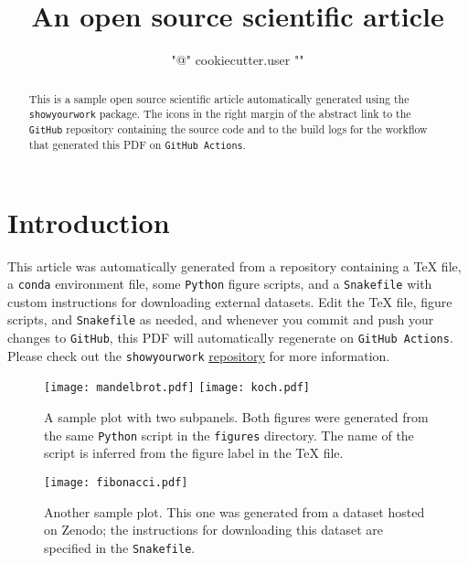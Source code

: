 \documentclass[twocolumn]{aastex631}
\begin{document}
\title{An open source scientific article}

\author{{ "{@" }}{{ cookiecutter.user }}{{ "}" }}

\begin{abstract}
    This is a sample open source scientific article automatically generated using the \texttt{showyourwork} package.
    The icons in the right margin of the abstract link to the \texttt{GitHub} repository containing the source code and to the build logs for the workflow that generated this PDF on \texttt{GitHub Actions}.
\end{abstract}

\section{Introduction}
This article was automatically generated from a repository containing a TeX file,
a \texttt{conda} environment file, some \texttt{Python} figure scripts, and a \texttt{Snakefile} with custom instructions for downloading external datasets.
Edit the TeX file, figure scripts, and \texttt{Snakefile} as needed, and whenever you commit and push your changes to \texttt{GitHub}, this PDF will automatically regenerate on \texttt{GitHub Actions}. Please check out the \texttt{showyourwork} \href{https://github.com/rodluger/showyourwork}{repository} for more information.

\begin{figure}[ht!]
    \begin{centering}
        \texttt{[image: mandelbrot.pdf]}
        \texttt{[image: koch.pdf]}
        \caption{
            A sample plot with two subpanels.
            Both figures were generated from the same \texttt{Python} script in the \texttt{figures} directory.
            The name of the script is inferred from the figure label in the TeX file.
        }
        \label{fig:fractals}
    \end{centering}
\end{figure}

\begin{figure}[ht!]
    \begin{centering}
        \texttt{[image: fibonacci.pdf]}
        \caption{
            Another sample plot.
            This one was generated from a dataset hosted on Zenodo; the instructions for downloading this dataset are specified in the \texttt{Snakefile}.
        }
        \label{fig:fibonacci}
    \end{centering}
\end{figure}
\end{document}

